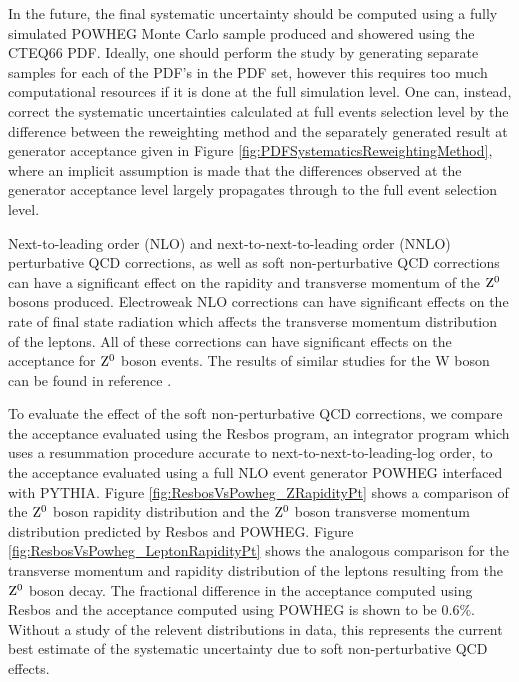 \documentclass{cmspaper}
\begin{document}
In the future, the final systematic uncertainty should be computed using a fully simulated POWHEG Monte Carlo sample produced and showered using the CTEQ66 PDF. Ideally, one should perform the study by generating separate samples for each of the PDF's in the PDF set, however this requires too much computational resources if it is done at the full simulation level. One can, instead, correct the systematic uncertainties calculated at full events selection level by the difference between the reweighting method and the separately generated result at generator acceptance given in Figure \ref{fig:PDFSystematicsReweightingMethod}, where an implicit assumption is made that the differences observed at the generator acceptance level largely propagates through to the full event selection level. 



Next-to-leading order (NLO) and next-to-next-to-leading order (NNLO) perturbative QCD corrections, as well as soft non-perturbative QCD corrections can have a significant effect on the rapidity and transverse momentum of the $\mathrm{Z^0}$ bosons produced. Electroweak NLO corrections can have significant effects on the rate of final state radiation which affects the transverse momentum distribution of the leptons. All of these corrections can have significant effects on the acceptance for $\mathrm{Z^0}$ boson events. The results of similar studies for the W boson can be found in reference \cite{HigherOrderQCDSystematicsForW}.

To evaluate the effect of the soft non-perturbative QCD corrections, we compare the acceptance evaluated using the Resbos program\cite{Resbos}, an integrator program which uses a resummation procedure accurate to next-to-next-to-leading-log order, to the acceptance evaluated using a full NLO event generator POWHEG\cite{Powheg} interfaced with PYTHIA. Figure \ref{fig:ResbosVsPowheg_ZRapidityPt} shows a comparison of the $\mathrm{Z^0}$ boson rapidity distribution and the $\mathrm{Z^0}$ boson transverse momentum distribution predicted by Resbos and POWHEG. Figure \ref{fig:ResbosVsPowheg_LeptonRapidityPt} shows the analogous comparison for the transverse momentum and rapidity distribution of the leptons resulting from the $\mathrm{Z^0}$ boson decay. The fractional difference in the acceptance computed using Resbos and the acceptance computed using POWHEG is shown to be $0.6\%$. Without a study of the relevent distributions in data, this represents the current best estimate of the systematic uncertainty due to soft non-perturbative QCD effects.
\end{document}
